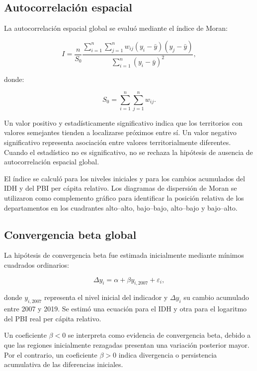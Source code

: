 \subsection{Autocorrelación espacial}

La autocorrelación espacial global se evaluó mediante el índice de Moran:

\begin{equation}
I
=
\frac{n}{S_0}
\frac{
\sum_{i=1}^{n}
\sum_{j=1}^{n}
w_{ij}(y_i-\bar{y})(y_j-\bar{y})
}{
\sum_{i=1}^{n}(y_i-\bar{y})^2
},
\label{eq:moran}
\end{equation}

donde:

\begin{equation}
S_0
=
\sum_{i=1}^{n}
\sum_{j=1}^{n}w_{ij}.
\end{equation}

Un valor positivo y estadísticamente significativo indica que los territorios
con valores semejantes tienden a localizarse próximos entre sí. Un valor
negativo significativo representa asociación entre valores territorialmente
diferentes. Cuando el estadístico no es significativo, no se rechaza la
hipótesis de ausencia de autocorrelación espacial global.

El índice se calculó para los niveles iniciales y para los cambios acumulados
del IDH y del PBI per cápita relativo. Los diagramas de dispersión de Moran se
utilizaron como complemento gráfico para identificar la posición relativa de
los departamentos en los cuadrantes alto--alto, bajo--bajo, alto--bajo y
bajo--alto.

\subsection{Convergencia beta global}

La hipótesis de convergencia beta fue estimada inicialmente mediante mínimos
cuadrados ordinarios:

\begin{equation}
\Delta y_i
=
\alpha
+
\beta y_{i,2007}
+
\varepsilon_i,
\label{eq:ols_convergencia}
\end{equation}

donde $y_{i,2007}$ representa el nivel inicial del indicador y $\Delta y_i$ su
cambio acumulado entre 2007 y 2019. Se estimó una ecuación para el IDH y otra
para el logaritmo del PBI real per cápita relativo.

Un coeficiente $\beta<0$ se interpreta como evidencia de convergencia beta,
debido a que las regiones inicialmente rezagadas presentan una variación
posterior mayor. Por el contrario, un coeficiente $\beta>0$ indica divergencia
o persistencia acumulativa de las diferencias iniciales.

